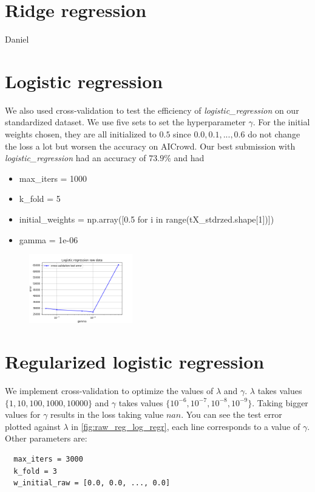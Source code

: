 \documentclass[11pt, a4paper, twoside]{article}
\begin{document}
\section{Ridge regression}
Daniel

\section{Logistic regression}
We also used cross-validation to test the efficiency of
\textit{logistic\_regression} on our standardized dataset.
We use five sets to set the hyperparameter $\gamma$.
For the initial weights chosen, they are all initialized to $0.5$ since $0.0, 0.1, ..., 0.6$ do not change the loss a lot but worsen the accuracy on AICrowd.
Our best submission with \textit{logistic\_regression} had an accuracy of $73.9\%$ and had 
\begin{itemize}
  \item max\_iters = 1000
  \item k\_fold = 5
  \item initial\_weights = np.array([0.5 for i in range(tX\_stdrzed.shape[1])])
  \item gamma = 1e-06
\end{itemize}

\begin{figure}[h]
  \includegraphics[width=0.4\textwidth]{raw_data_logistic_regression.png}
    \label{fig:log_reg}
\end{figure}

\section{Regularized logistic regression}
We implement cross-validation to optimize the values of $\lambda$ and $\gamma$. $\lambda$ takes values
$\{1,10,100,1000,10000\}$ and $\gamma$ takes values $\{10^{-6},10^{-7},10^{-8},10^{-9}\}$. Taking bigger
values for $\gamma$ results in the loss taking value $nan$. You can see the test error plotted against $\lambda$ in \ref{fig:raw_reg_log_regr}, each line corresponds to a value of $\gamma$. Other parameters are: 
\begin{lstlisting}
  max_iters = 3000
  k_fold = 3
  w_initial_raw = [0.0, 0.0, ..., 0.0]
\end{lstlisting}
\end{document}
